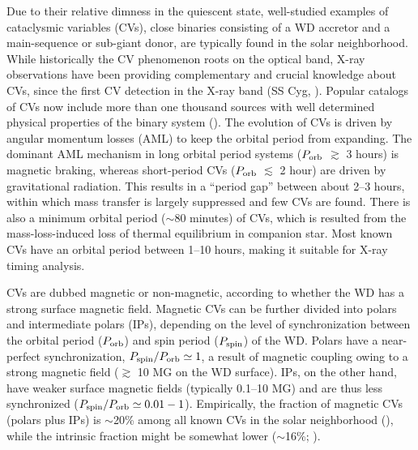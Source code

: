 \documentclass[fleqn,usenatbib]{mnras}
\begin{document}
Due to their relative dimness in the quiescent state,
well-studied examples of cataclysmic variables (CVs), close binaries consisting of a WD accretor and a main-sequence or sub-giant donor,
are typically found in the solar neighborhood. 
While historically the CV phenomenon roots on the optical band, X-ray observations have been providing complementary and crucial knowledge about CVs, since the first CV detection in the X-ray band (SS Cyg, \citealp{1974ApJ...187L...5R,1978ApJ...224..953S}). 
Popular catalogs of CVs now include more than one thousand sources with well determined physical properties of the binary system (\citealp{2001PASP..113..764D,2003A&A...404..301R}).
The evolution of CVs is driven by angular momentum losses (AML) to keep the orbital period from expanding. 
The dominant AML mechanism in long orbital period systems ($P_{\rm orb}$ $\gtrsim$ 3 hours) is magnetic braking, whereas short-period CVs ($P_{\rm orb}$ $\lesssim$ 2 hour) are driven by gravitational radiation. This results in  a ``period gap'' between about 2--3 hours, within which mass transfer is largely suppressed and few CVs are found. There is also a minimum orbital period ($\sim$80 minutes) of CVs, which is resulted from the mass-loss-induced loss of thermal equilibrium in companion star. 
Most known CVs have an orbital period between 1--10 hours, making it suitable for X-ray timing analysis. 

CVs are dubbed magnetic or non-magnetic, according to whether the WD has a strong surface magnetic field. Magnetic CVs can be further divided into polars and intermediate polars (IPs), depending on the level of synchronization between the orbital period ($P_{\rm orb}$) and spin period ($P_{\rm spin}$) of the WD. Polars have a near-perfect synchronization, $P_{\rm spin}/P_{\rm orb}\simeq 1$, a result of magnetic coupling owing to a strong magnetic field ($\gtrsim$ 10 MG on the WD surface).
IPs, on the other hand, have weaker surface magnetic fields (typically 0.1--10 MG) and are thus less synchronized ($P_{\rm spin}/P_{\rm orb}\simeq 0.01-1$).
Empirically, the fraction of magnetic CVs (polars plus IPs) is $\sim$20\% among all known CVs in the solar neighborhood (\citealt{2003A&A...404..301R}), while the intrinsic fraction might be somewhat lower ($\sim$16\%; \citealp{2013MNRAS.432..570P}).
\end{document}
